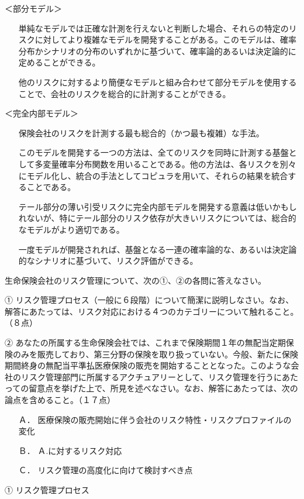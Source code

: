 \documentclass[report,gutter=10mm,fore-edge=10mm,uplatex,dvipdfmx]{jlreq}
\begin{document}
＜部分モデル＞

\begin{itemize}
\item[] 単純なモデルでは正確な計測を行えないと判断した場合、それらの特定のリスクに対してより複雑なモデルを開発することがある。このモデルは、確率分布かシナリオの分布のいずれかに基づいて、確率論的あるいは決定論的に定めることができる。
\item[] 他のリスクに対するより簡便なモデルと組み合わせて部分モデルを使用することで、会社のリスクを総合的に計測することができる。
\end{itemize}

＜完全内部モデル＞

\begin{itemize}
\item[] 保険会社のリスクを計測する最も総合的（かつ最も複雑）な手法。
\item[] このモデルを開発する一つの方法は、全てのリスクを同時に計測する基盤として多変量確率分布関数を用いることである。他の方法は、各リスクを別々にモデル化し、統合の手法としてコピュラを用いて、それらの結果を統合することである。
\item[] テール部分の薄い引受リスクに完全内部モデルを開発する意義は低いかもしれないが、特にテール部分のリスク依存が大きいリスクについては、総合的なモデルがより適切である。
\item[] 一度モデルが開発されれば、基盤となる一連の確率論的な、あるいは決定論的なシナリオに基づいて、リスク評価ができる。
\end{itemize}
生命保険会社のリスク管理について、次の①、②の各問に答えなさい。

① リスク管理プロセス（一般に６段階）について簡潔に説明しなさい。なお、解答にあたっては、リスク対応における４つのカテゴリーについて触れること。（８点）

② あなたの所属する生命保険会社では、これまで保険期間１年の無配当定期保険のみを販売しており、第三分野の保険を取り扱っていない。今般、新たに保険期間終身の無配当平準払医療保険の販売を開始することとなった。このような会社のリスク管理部門に所属するアクチュアリーとして、リスク管理を行うにあたっての留意点を挙げた上で、所見を述べなさい。なお、解答にあたっては、次の論点を含めること。（１７点）

\begin{itemize}
\item[ Ａ．] 医療保険の販売開始に伴う会社のリスク特性・リスクプロファイルの変化
\item[ Ｂ．] Ａ.に対するリスク対応
\item[ Ｃ．] リスク管理の高度化に向けて検討すべき点
\end{itemize}
\answer{}
① リスク管理プロセス
\end{document}
